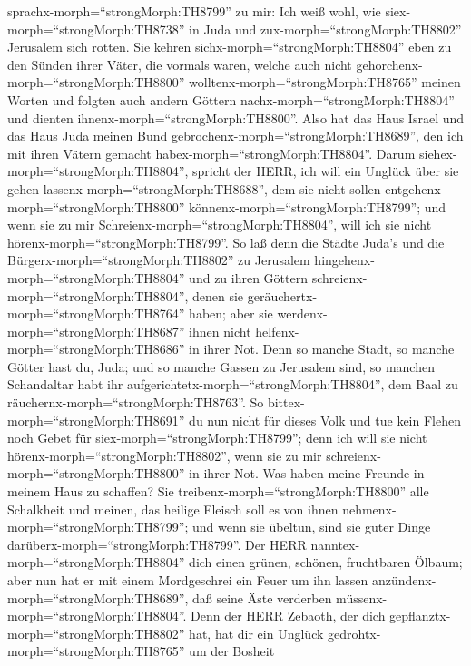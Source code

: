 sprachx-morph=``strongMorph:TH8799'' zu mir: Ich weiß wohl, wie
siex-morph=``strongMorph:TH8738'' in Juda und
zux-morph=``strongMorph:TH8802'' Jerusalem sich rotten. 
Sie kehren sichx-morph=``strongMorph:TH8804'' eben zu den Sünden ihrer
Väter, die vormals waren, welche auch nicht
gehorchenx-morph=``strongMorph:TH8800''
wolltenx-morph=``strongMorph:TH8765'' meinen Worten und folgten auch
andern Göttern nachx-morph=``strongMorph:TH8804'' und dienten
ihnenx-morph=``strongMorph:TH8800''. Also hat das Haus Israel und das
Haus Juda meinen Bund gebrochenx-morph=``strongMorph:TH8689'', den ich
mit ihren Vätern gemacht habex-morph=``strongMorph:TH8804''.
 Darum siehex-morph=``strongMorph:TH8804'', spricht der
HERR, ich will ein Unglück über sie gehen
lassenx-morph=``strongMorph:TH8688'', dem sie nicht sollen
entgehenx-morph=``strongMorph:TH8800''
könnenx-morph=``strongMorph:TH8799''; und wenn sie zu mir
Schreienx-morph=``strongMorph:TH8804'', will ich sie nicht
hörenx-morph=``strongMorph:TH8799''.  So laß denn die
Städte Juda's und die Bürgerx-morph=``strongMorph:TH8802'' zu Jerusalem
hingehenx-morph=``strongMorph:TH8804'' und zu ihren Göttern
schreienx-morph=``strongMorph:TH8804'', denen sie
geräuchertx-morph=``strongMorph:TH8764'' haben; aber sie
werdenx-morph=``strongMorph:TH8687'' ihnen nicht
helfenx-morph=``strongMorph:TH8686'' in ihrer Not.  Denn so
manche Stadt, so manche Götter hast du, Juda; und so manche Gassen zu
Jerusalem sind, so manchen Schandaltar habt ihr
aufgerichtetx-morph=``strongMorph:TH8804'', dem Baal zu
räuchernx-morph=``strongMorph:TH8763''.  So
bittex-morph=``strongMorph:TH8691'' du nun nicht für dieses Volk und tue
kein Flehen noch Gebet für siex-morph=``strongMorph:TH8799''; denn ich
will sie nicht hörenx-morph=``strongMorph:TH8802'', wenn sie zu mir
schreienx-morph=``strongMorph:TH8800'' in ihrer Not.  Was
haben meine Freunde in meinem Haus zu schaffen? Sie
treibenx-morph=``strongMorph:TH8800'' alle Schalkheit und meinen, das
heilige Fleisch soll es von ihnen nehmenx-morph=``strongMorph:TH8799'';
und wenn sie übeltun, sind sie guter Dinge
darüberx-morph=``strongMorph:TH8799''.  Der HERR
nanntex-morph=``strongMorph:TH8804'' dich einen grünen, schönen,
fruchtbaren Ölbaum; aber nun hat er mit einem Mordgeschrei ein Feuer um
ihn lassen anzündenx-morph=``strongMorph:TH8689'', daß seine Äste
verderben müssenx-morph=``strongMorph:TH8804''.  Denn der
HERR Zebaoth, der dich gepflanztx-morph=``strongMorph:TH8802'' hat, hat
dir ein Unglück gedrohtx-morph=``strongMorph:TH8765'' um der Bosheit
